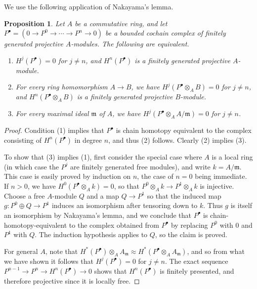 \documentclass[11pt]{amsart}
\numberwithin{equation}{section}
\theoremstyle{plain}
\newtheorem{prop}[subsection]{Proposition}
\theoremstyle{remark}
\theoremstyle{plain}
\begin{document}
We use the following application of
Nakayama's lemma.
\begin{prop}\label{prop:nak-lemma}
Let $A$ be a commutative ring, and let $P^\bullet=(0{\rightarrow} P^0{\rightarrow} \cdots
{\rightarrow} P^n{\rightarrow} 0)$ be a bounded cochain complex of finitely generated projective
$A$-modules.  The following are equivalent.
\begin{enumerate}
\item $H^j(P^\bullet)=0$ for $j\neq n$, and $H^n(P^\bullet)$ is a
  finitely generated projective $A$-module.
\item For every ring homomorphism $A{\rightarrow} B$, we have
  $H^j(P^\bullet\otimes_A 
  B)=0$ for   $j\neq n$, and $H^n(P^\bullet\otimes_A B)$ is a finitely
  generated projective $B$-module.
\item For every maximal ideal $\mathfrak{m}$ of $A$, we have
  $H^j(P^\bullet\otimes_A A/\mathfrak{m})=0$ for $j\neq n$.
\end{enumerate}
\end{prop}
 \begin{proof}
 Condition (1) implies that $P^\bullet$ is chain homotopy equivalent to
 the complex consisting of $H^n(P^\bullet)$ in degree $n$, and thus (2)
 follows.  Clearly (2) implies (3).
 
 To show that (3) implies (1), first consider the special case where
 $A$ is a local ring (in which case the $P^j$ are 
 finitely generated free modules), and write $k=A/\mathfrak{m}$.  This
 case is easily proved by
 induction on $n$, the case of $n=0$ being immediate.  If $n>0$, we
 have $H^0(P^\bullet\otimes_A k)=0$, so that
 $P^0\otimes_Ak{\rightarrow} P^{1}\otimes_A k$ is injective.  Choose a free
 $A$-module $Q$ and a map $Q{\rightarrow} P^{1}$ so that the induced map
 $g\colon P^{0}\oplus Q {\rightarrow} P^{1}$ induces an isomorphism after tensoring
 down to $k$.  Thus $g$ is itself an isomorphism by Nakayama's lemma,
 and we conclude that 
 $P^\bullet$ is chain-homotopy-equivalent to the complex obtained from
 $P^\bullet$ by replacing $P^0$ with
 $0$ and $P^{1}$ with $Q$.  The induction hypothesis applies to $Q$,
 so the claim is proved.
 
 For general $A$, note that $H^*(P^\bullet)\otimes_A
 A_{\mathfrak{m}}\approx H^*(P^\bullet\otimes_AA_\mathfrak{m})$, and so
 from what we have shown it follows that $H^j(P^\bullet)=0$ for $j\neq
 n$.  The exact 
 sequence $P^{n-1}{\rightarrow} P^n{\rightarrow} H^n(P^\bullet){\rightarrow}0$ shows that
 $H^n(P^\bullet)$ is finitely presented, and therefore projective since it is
 locally free.
 \end{proof}
\end{document}

